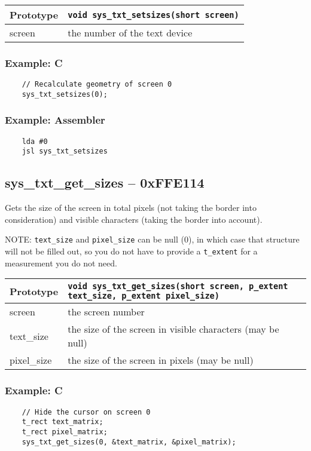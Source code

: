 \bigskip

\begin{tabular}{|l||l|} \hline
Prototype & \lstinline!void sys_txt_setsizes(short screen)! \\ \hline
screen & the number of the text device \\ \hline
\end{tabular}

\subsubsection*{Example: C}
\begin{lstlisting}
    // Recalculate geometry of screen 0
    sys_txt_setsizes(0);
\end{lstlisting}

\subsubsection*{Example: Assembler}
\begin{verbatim}
    lda #0
    jsl sys_txt_setsizes
\end{verbatim}

\subsection*{sys\_txt\_get\_sizes -- 0xFFE114}
Gets the size of the screen in total pixels (not taking the border into consideration) and visible characters (taking the border into account).

NOTE: \verb+text_size+ and \verb+pixel_size+ can be null (0), in which case that structure will not be filled out,
so you do not have to provide a \verb+t_extent+ for a measurement you do not need.

\begin{tabular}{|l||l|} \hline
Prototype & \lstinline!void sys_txt_get_sizes(short screen, p_extent text_size, p_extent pixel_size)! \\ \hline
screen & the screen number  \\ \hline
text\_size & the size of the screen in visible characters (may be null) \\ \hline
pixel\_size & the size of the screen in pixels (may be null) \\ \hline
\end{tabular}

\subsubsection*{Example: C}
\begin{lstlisting}
    // Hide the cursor on screen 0
    t_rect text_matrix;
    t_rect pixel_matrix;
    sys_txt_get_sizes(0, &text_matrix, &pixel_matrix);    
\end{lstlisting}

